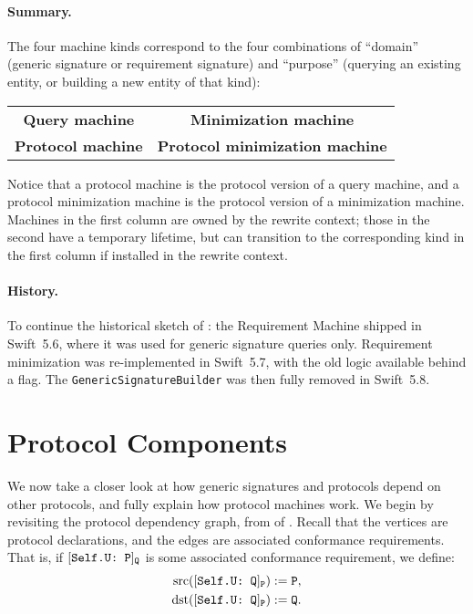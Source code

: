 \documentclass[../generics]{subfiles}
\begin{document}
\paragraph{Summary.}
The four machine kinds correspond to the four combinations of ``domain'' (generic signature or requirement signature) and ``purpose'' (querying an existing entity, or building a new entity of that kind):
\begin{center}
\begin{tabular}{cc}
\toprule
\index{query machine!summary}\textbf{Query machine}&\index{minimization machine!summary}\textbf{Minimization machine}\\
\index{protocol machine!summary}\textbf{Protocol machine}&\index{protocol minimization machine!summary}\textbf{Protocol minimization machine}\\
\bottomrule
\end{tabular}
\end{center}
Notice that a protocol machine is the protocol version of a query machine, and a protocol minimization machine is the protocol version of a minimization machine. Machines in the first column are owned by the rewrite context; those in the second have a temporary lifetime, but can transition to the corresponding kind in the first column if  installed in the rewrite context.

\paragraph{History.}
To continue the historical sketch of : the Requirement Machine shipped in Swift~5.6, where it was used for generic signature queries only. Requirement minimization was re-implemented in Swift~5.7, with the old logic available behind a flag. The \texttt{GenericSignatureBuilder} was then fully removed in Swift~5.8.

\section{Protocol Components}\label{protocol component}

We now take a closer look at how generic signatures and protocols depend on other protocols, and fully explain how protocol machines work. We begin by revisiting the protocol dependency graph, from  of . Recall that the vertices are protocol declarations, and the edges are associated conformance requirements. That is, if $[\texttt{Self.U:~P}]_{\texttt{Q}}$ is some associated conformance requirement, we define:
\begin{align*}
\operatorname{src}([\texttt{Self.U:~Q}]_{\texttt{P}})&:=\texttt{P},\\
\operatorname{dst}([\texttt{Self.U:~Q}]_{\texttt{P}})&:=\texttt{Q}.
\end{align*}
\end{document}

